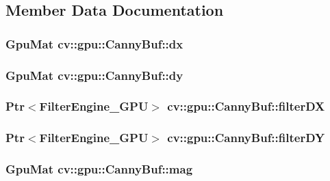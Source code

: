 \subsection{Member Data Documentation}
\hypertarget{structcv_1_1gpu_1_1CannyBuf_abe8804c3ac1ffe9d395002253c161edf}{
\subsubsection[{dx}]{\setlength{\rightskip}{0pt plus 5cm}Gpu\-Mat cv\-::gpu\-::\-Canny\-Buf\-::dx}}\label{structcv_1_1gpu_1_1CannyBuf_abe8804c3ac1ffe9d395002253c161edf}
\hypertarget{structcv_1_1gpu_1_1CannyBuf_af6a87c2f0acf77054e2ba27f053aa587}{
\subsubsection[{dy}]{\setlength{\rightskip}{0pt plus 5cm}Gpu\-Mat cv\-::gpu\-::\-Canny\-Buf\-::dy}}\label{structcv_1_1gpu_1_1CannyBuf_af6a87c2f0acf77054e2ba27f053aa587}
\hypertarget{structcv_1_1gpu_1_1CannyBuf_a696a7f77590cda379ea4b275697f6d6c}{
\subsubsection[{filter\-D\-X}]{\setlength{\rightskip}{0pt plus 5cm}Ptr$<${\bf Filter\-Engine\-\_\-\-G\-P\-U}$>$ cv\-::gpu\-::\-Canny\-Buf\-::filter\-D\-X}}\label{structcv_1_1gpu_1_1CannyBuf_a696a7f77590cda379ea4b275697f6d6c}
\hypertarget{structcv_1_1gpu_1_1CannyBuf_abbf4d1c0a9096fad24ba817c58943aa6}{
\subsubsection[{filter\-D\-Y}]{\setlength{\rightskip}{0pt plus 5cm}Ptr$<${\bf Filter\-Engine\-\_\-\-G\-P\-U}$>$ cv\-::gpu\-::\-Canny\-Buf\-::filter\-D\-Y}}\label{structcv_1_1gpu_1_1CannyBuf_abbf4d1c0a9096fad24ba817c58943aa6}
\hypertarget{structcv_1_1gpu_1_1CannyBuf_ae64d28d2fdb6359ba57669baf810af19}{
\subsubsection[{mag}]{\setlength{\rightskip}{0pt plus 5cm}Gpu\-Mat cv\-::gpu\-::\-Canny\-Buf\-::mag}}\label{structcv_1_1gpu_1_1CannyBuf_ae64d28d2fdb6359ba57669baf810af19}
